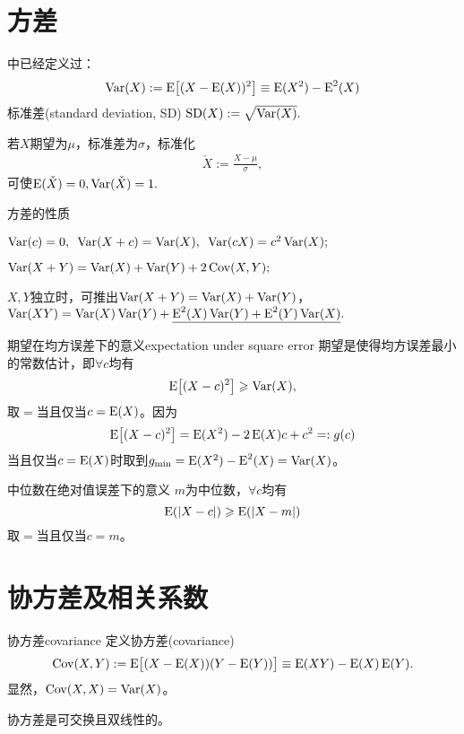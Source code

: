 \section{方差}

 中已经定义过：
\begin{align}
	\Var(X):=\E\bigfkh{(X-\E(X))^2}\equiv\E(X^2)-\E^2(X)
\end{align}
标准差(standard deviation, SD) $\SD(X):=\sqrt{\Var(X)}.$

若$X$期望为$\mu$，标准差为$\sigma$，标准化
\begin{align}
	\check X:=\frac{X-\mu}{\sigma},
\end{align}
可使$\E(\check X)=0,\Var(\check X)=1.$
\begin{theorem}{方差的性质}{}
	\begin{compactenum}
		\item $\Var(c)=0,\enspace\Var(X+c)=\Var(X),\enspace\Var(cX)=c^2\Var(X);$
		\item $\Var(X+Y)=\Var(X)+\Var(Y)+2\Cov(X,Y);$
		\item $X,Y$独立时，可推出$\Var(X+Y)=\Var(X)+\Var(Y)$，\\
		$\Var(XY)=\Var(X)\Var(Y)+\underline{\E^2(X)\Var(Y)+\E^2(Y)\Var(X)}.$
	\end{compactenum}	
\end{theorem}
\begin{example}{期望在均方误差下的意义}{expectation under square error}
	期望是使得均方误差最小的常数估计，即$\forall c$均有
	\[
		\E\bigfkh{(X-c)^2}\geqslant\Var(X),
	\]
	取$=$当且仅当$c=\E(X)$。因为
	\begin{align*}
		\E\bigfkh{(X-c)^2}=\E(X^2)-2\E(X)c+c^2=:g(c)
	\end{align*}
	当且仅当$c=\E(X)$时取到$g_{\mathrm{min}}=\E(X^2)-\E^2(X)=\Var(X)$。
\end{example}
\begin{example}{中位数在绝对值误差下的意义}{}
	$m$为中位数，$\forall c$均有
	\[
		\E(|X-c|)\geqslant\E(|X-m|)
	\]
	取$=$当且仅当$c=m$。
\end{example}
\section{协方差及相关系数}
\begin{definition}{协方差}{covariance}
	定义协方差(covariance)
	\begin{align}
		\Cov(X,Y):=\E\bigfkh{(X-\E(X))(Y-\E(Y))}\equiv\E(XY)-\E(X)\E(Y).
	\end{align}
	显然，$\Cov(X,X)=\Var(X)$。
\end{definition}
协方差是可交换且双线性的。

